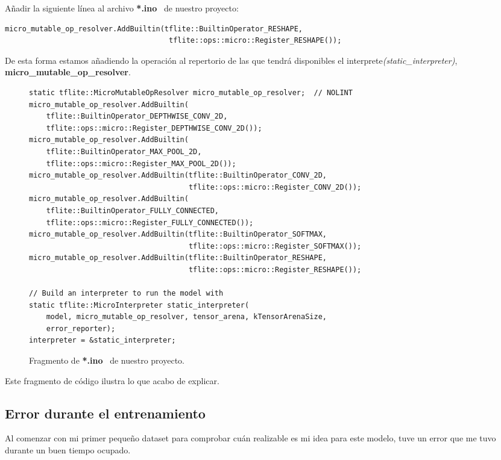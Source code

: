 \begin{mimargen}{-1cm}{-1cm}
Añadir la siguiente línea al archivo \small\textbf{*.ino}\normalsize~
de nuestro proyecto:
\begin{lstlisting}
micro_mutable_op_resolver.AddBuiltin(tflite::BuiltinOperator_RESHAPE,
                                      tflite::ops::micro::Register_RESHAPE());
\end{lstlisting}

De esta forma estamos añadiendo la operación al repertorio de las que tendrá
disponibles el interprete\small\textit{(static\_interpreter)}\normalsize,
\small\textbf{micro\_mutable\_op\_resolver}\normalsize.

\begin{figure}[h]
\begin{lstlisting}[firstnumber=72]
static tflite::MicroMutableOpResolver micro_mutable_op_resolver;  // NOLINT
micro_mutable_op_resolver.AddBuiltin(
    tflite::BuiltinOperator_DEPTHWISE_CONV_2D,
    tflite::ops::micro::Register_DEPTHWISE_CONV_2D());
micro_mutable_op_resolver.AddBuiltin(
    tflite::BuiltinOperator_MAX_POOL_2D,
    tflite::ops::micro::Register_MAX_POOL_2D());
micro_mutable_op_resolver.AddBuiltin(tflite::BuiltinOperator_CONV_2D,
                                     tflite::ops::micro::Register_CONV_2D());
micro_mutable_op_resolver.AddBuiltin(
    tflite::BuiltinOperator_FULLY_CONNECTED,
    tflite::ops::micro::Register_FULLY_CONNECTED());
micro_mutable_op_resolver.AddBuiltin(tflite::BuiltinOperator_SOFTMAX,
                                     tflite::ops::micro::Register_SOFTMAX());
micro_mutable_op_resolver.AddBuiltin(tflite::BuiltinOperator_RESHAPE,
                                     tflite::ops::micro::Register_RESHAPE());
                                     
// Build an interpreter to run the model with
static tflite::MicroInterpreter static_interpreter(
    model, micro_mutable_op_resolver, tensor_arena, kTensorArenaSize,
    error_reporter);
interpreter = &static_interpreter;
\end{lstlisting}
\caption{Fragmento de \small\textbf{*.ino}\normalsize~ de nuestro proyecto.}
\end{figure}

Este fragmento de código ilustra lo que acabo de explicar.


\subsection{Error durante el entrenamiento}
Al comenzar con mi primer pequeño dataset para comprobar cuán realizable es
mi idea para este modelo, tuve un error que me tuvo durante un buen tiempo
ocupado.


\end{mimargen}
